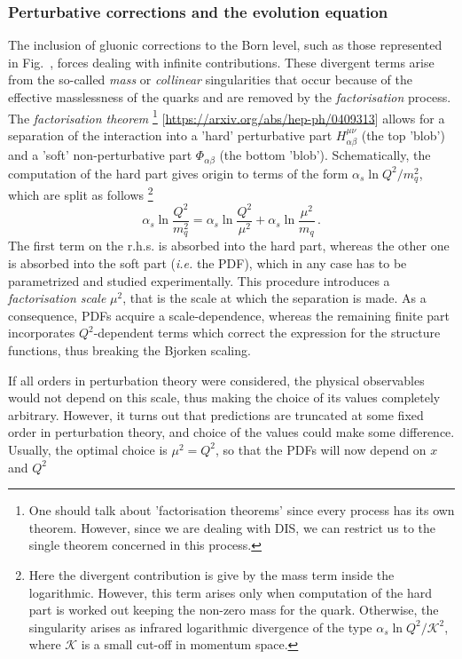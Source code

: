 \subsubsection*{Perturbative corrections and the evolution equation}
The inclusion of gluonic corrections to the Born level, such as those represented in Fig.~, forces dealing with infinite contributions. These divergent terms arise from the so-called \textit{mass} or \textit{collinear} singularities that occur because of the effective masslessness of the quarks and are removed by the \textit{factorisation} process. The \textit{factorisation theorem} 
\footnote{One should talk about 'factorisation theorems' since every process has its own theorem. However, since we are dealing with DIS, we can restrict us to the single theorem concerned in this process.}
[\href{https://arxiv.org/abs/hep-ph/0409313}{https://arxiv.org/abs/hep-ph/0409313}] allows for a separation of the interaction into a 'hard' perturbative part $H^{\mu \nu}_{\alpha \beta}$ (the top 'blob') and a 'soft' non-perturbative part $\Phi_{\alpha \beta}$ (the bottom 'blob'). Schematically, the computation of the hard part gives origin to terms of the form $\alpha_{s} \ln Q^2/m_q^2$, which are split as follows
\footnote{Here the divergent contribution is give by the mass term inside the logarithmic. However, this term arises only when computation of the hard part is worked out keeping the non-zero mass for the quark. Otherwise, the singularity arises as infrared logarithmic divergence of the type $\alpha_{s} \ln Q^2/\mathcal{K}^2$, where $\mathcal{K}$ is a small cut-off in momentum space.}
\begin{equation}
  \alpha_{s} \ln \frac{Q^2}{m_q^2} = \alpha_{s} \ln \frac{Q^2}{\mu^2} + \alpha_{s} \ln \frac{\mu^2}{m_{q}} \,.
\end{equation}
The first term on the r.h.s. is absorbed into the hard part, whereas the other one is absorbed into the soft part (\textit{i.e.} the PDF), which in any case has to be parametrized and studied experimentally. This procedure introduces a \textit{factorisation scale} $\mu^2$, that is the scale at which the separation is made. As a consequence, PDFs acquire a scale-dependence, whereas the remaining finite part incorporates $Q^2$-dependent terms which correct the expression for the structure functions, thus breaking the Bjorken scaling. \par
If all orders in perturbation theory were considered, the physical observables would not depend on this scale, thus making the choice of its values completely arbitrary. However, it turns out that predictions are truncated at some fixed order in perturbation theory, and choice of the values could make some difference. Usually, the optimal choice is $\mu^2 = Q^2$, so that the PDFs will now depend on $x$ and $Q^2$
